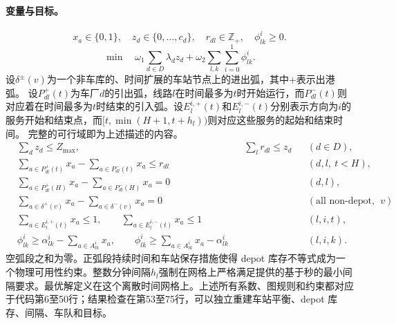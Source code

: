\documentclass[11pt]{article}
\begin{document}
\paragraph{变量与目标。}
\[
x_a\in\{0,1\},\quad
z_d\in\{0,\ldots,c_d\},\quad
r_{dl}\in\mathbb Z_+,\quad \phi^i_{lk}\ge0.
\]
\[
\min\quad
\omega_1\sum_{d\in D}\lambda_d z_d+
\omega_2\sum_{l,k}\sum_{i=0}^1\phi^i_{lk}.
\]
设$\delta^\pm(v)$为一个非车库的、时间扩展的车站节点上的进出弧，其中$+$表示出港弧。  
设$P^+_{dl}(t)$为车厂$d$的引出弧，线路$l$在时间最多为$t$时开始运行，而$P^-_{dl}(t)$则对应着在时间最多为$t$时结束的引入弧。设$E^{i,+}_{l}(t)$和$E^{i,-}_{l}(t)$分别表示方向为$i$的服务开始和结束点，而$[t,\min(H+1,t+h_l))$则对应这些服务的起始和结束时间。  
完整的可行域即为上述描述的内容。
\begin{align}
&\sum_d z_d\le Z_{\max},&
&\sum_l r_{dl}\le z_d &&(d\in D),\\
&\sum_{a\in P^+_{dl}(t)}x_a-\sum_{a\in P^-_{dl}(t)}x_a
 \le r_{dl} &&&&(d,l,\ t<H),\\
&\sum_{a\in P^+_{dl}(H)}x_a-\sum_{a\in P^-_{dl}(H)}x_a=0
 &&&&(d,l),\\
&\sum_{a\in\delta^+(v)}x_a-\sum_{a\in\delta^-(v)}x_a=0
 &&&&(\text{all non-depot nodes }v),\\
&\sum_{a\in E^{i,+}_l(t)}x_a\le1,\qquad
 \sum_{a\in E^{i,-}_l(t)}x_a\le1 &&&&(l,i,t),\\
&\phi^i_{lk}\ge\alpha^i_{lk}-\sum_{a\in A^i_{lk}}x_a,\qquad
 \phi^i_{lk}\ge\sum_{a\in A^i_{lk}}x_a-\alpha^i_{lk}
 &&&&(l,i,k).
\end{align}
空弧段之和为零。正弧段持续时间和车站保存措施使得 depot 库存不等式成为一个物理可用性约束。整数分钟间隔$h_l$强制在网格上严格满足提供的基于秒的最小间隔要求。最优解定义在这个离散时间网格上。上述所有系数、图规则和约束都对应于代码第6至50行；结果检查在第53至75行，可以独立重建车站平衡、depot 库存、间隔、车队和目标。
\end{document}
